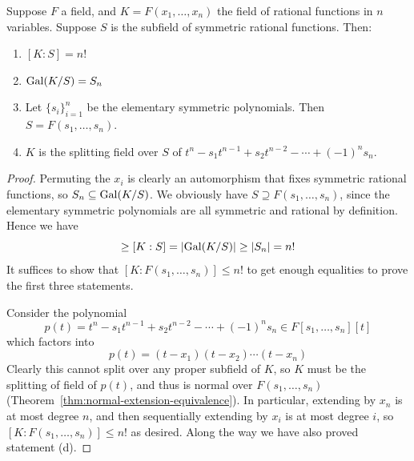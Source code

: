 \begin{theorem}
    Suppose \(F\) a field, and \(K = F(x_1,\hdots,x_n)\)
    the field of rational functions in \(n\) variables.
    Suppose \(S\) is the subfield of symmetric rational functions.
    Then:
    \begin{enumerate}[label={(\alph*)}, itemsep=0mm]
        \item \([K:S] = n!\)
        \item \(\operatorname{Gal}(K/S) = S_n\)
        \item Let \({\{s_i\}}_{i=1}^n\) be the elementary symmetric polynomials.
            Then \(S = F(s_1,\hdots,s_n)\).
        \item \(K\) is the splitting field over \(S\) of
            \(t^n - s_1 t^{n-1} + s_2 t^{n-2} - \cdots + {(-1)}^n s_n\).
    \end{enumerate}
\end{theorem}
\begin{proof}
    Permuting the \(x_i\) is clearly an automorphism that fixes symmetric rational functions,
    so \(S_n \subseteq \operatorname{Gal}(K/S)\).
    We obviously have \(S \supseteq F(s_1,\hdots,s_n)\),
    since the elementary symmetric polynomials are all symmetric and rational by definition.
    Hence we have
    \begin{equation*}
        [K:F(s_1,\hdots,s_n)] \geq [K:S] = \abs{\Gal(K/S)} \geq \abs{S_n} = n!
    \end{equation*}
    It suffices to show that \([K:F(s_1,\hdots,s_n)] \leq n!\)
    to get enough equalities to prove the first three statements.

    Consider the polynomial
    \begin{equation*}
        p(t) = t^n - s_1 t^{n-1} + s_2 t^{n-2} - \cdots + {(-1)}^n s_n \in F[s_1,\hdots,s_n][t]
    \end{equation*}
    which factors into
    \begin{equation*}
        p(t) = (t-x_1)(t-x_2)\cdots(t-x_n)
    \end{equation*}
    Clearly this cannot split over any proper subfield of \(K\),
    so \(K\) must be the splitting of field of \(p(t)\),
    and thus is normal over \(F(s_1,\hdots,s_n)\) (Theorem~\ref{thm:normal-extension-equivalence}).
    In particular, extending by \(x_n\) is at most degree \(n\),
    and then sequentially extending by \(x_i\) is at most degree \(i\),
    so \([K:F(s_1,\hdots,s_n)] \leq n!\) as desired.
    Along the way we have also proved statement (d).
\end{proof}

